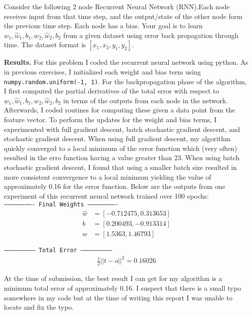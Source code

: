 \documentclass[8pt]{article}
\theoremstyle{definition}
\newenvironment{exercise}[1]
  {\renewcommand\theinnerexercise{#1}\innerexercise}
  {\endinnerexercise}
\begin{document}
\newpage

\justify
\begin{exercise}{3}
Consider the following 2 node Recurrent Neural Network (RNN).Each node receives input
from that time step, and the output/state of the other node form the previous time step. Each
node has a bias. Your goal is to learn $w_1, \hat{w}_1, b_1, w_2, \hat{w}_2, b_2$ from a given dataset using error back propagation through time. The dataset format is $[x_1, x_2, y_1, y_2]$.\\
\end{exercise}

\noindent \textbf{Results.} For this problem I coded the recurrent neural network using python. As in previous exercises, I initialized each weight and bias term using \texttt{numpy.random.uniform(-1, 1)}. For the backpropagation phase of the algorithm, I first computed the partial derivatives of the total error with respect to $w_1, \hat{w}_1, b_1, w_2, \hat{w}_2, b_2$ in terms of the outputs from each node in the network. Afterwards, I coded routines for computing these given a data point from the feature vector. To perform the updates for the weight and bias terms, I experimented with full gradient descent, batch stochastic gradient descent, and stochastic gradient descent. When using full gradient descent, my algorithm quickly converged to a local minimum of the error function which (very often) resulted in the erro function having a value greater than 23. When using batch stochastic gradient descent, I found that using a smaller batch size resulted in more consistent convergence to a local minimum yielding the value of approximately 0.16 for the error function. Below are the outputs from one experiment of this recurrent neural network trained over 100 epochs:\\

\centering
\texttt{------------------------- Final Weights -------------------------}
\begin{align*}
  \hat{w} &= [-0.712475, 0.313653] \\
  b &= [0.200493, -0.913314] \\
  w &= [1.5363, 1.46793]
\end{align*}

\texttt{-------------------------- Total Error --------------------------}
\begin{align*}
  \frac{1}{2} || t - o ||^2 = 0.16026
\end{align*}

\justify
At the time of submission, the best result I can get for my algorithm is a minimum total error of approximately 0.16. I suspect that there is a small typo somewhere in my code but at the time of writing this report I was unable to locate and fix the typo.
\end{document}

